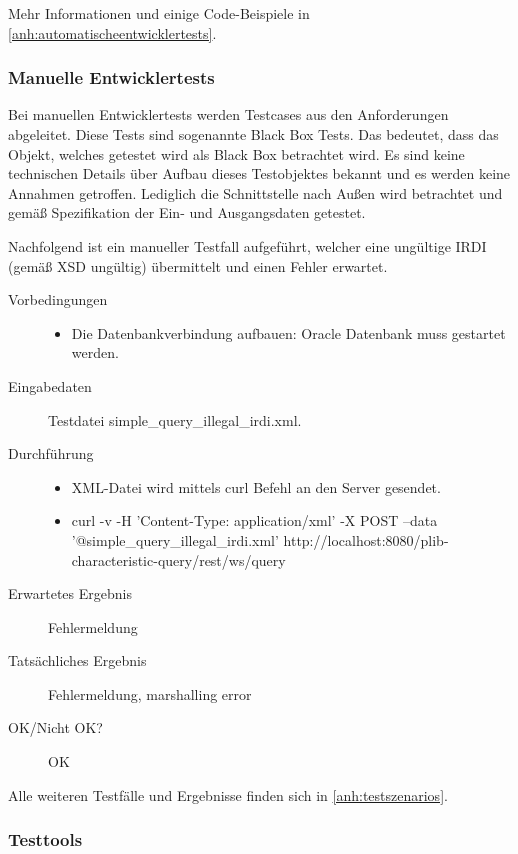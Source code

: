 Mehr Informationen und einige Code-Beispiele in \autoref{anh:automatischeentwicklertests}.

\subsubsection{Manuelle Entwicklertests}

Bei manuellen Entwicklertests werden Testcases aus den Anforderungen abgeleitet. Diese Tests sind sogenannte Black Box Tests. Das bedeutet, dass das Objekt, welches getestet wird als Black Box betrachtet wird. Es sind keine technischen Details über Aufbau dieses Testobjektes bekannt und es werden keine Annahmen getroffen. Lediglich die Schnittstelle nach Außen wird betrachtet und gemäß Spezifikation der Ein- und Ausgangsdaten getestet. 

Nachfolgend ist ein manueller Testfall aufgeführt, welcher eine ungültige IRDI (gemäß XSD ungültig) übermittelt und einen Fehler erwartet. 

\begin{description}
\item[Vorbedingungen] 
  \begin{itemize}
   \item Die Datenbankverbindung aufbauen: Oracle Datenbank muss gestartet werden.
  \end{itemize}
\item[Eingabedaten] Testdatei simple\_query\_illegal\_irdi.xml. 
\item[Durchführung]
   \begin{itemize}
   \item XML-Datei wird mittels curl Befehl an den Server gesendet.
   \item curl -v -H 'Content-Type: application/xml' -X POST --data '@simple\_query\_illegal\_irdi.xml' http://localhost:8080/plib-characteristic-query/rest/ws/query
  \end{itemize}
\item[Erwartetes Ergebnis] Fehlermeldung
\item[Tatsächliches Ergebnis] Fehlermeldung, marshalling error
\item[OK/Nicht OK?] OK
\end{description}

Alle weiteren Testfälle und Ergebnisse finden sich in \autoref{anh:testszenarios}.

\subsubsection{Testtools}

